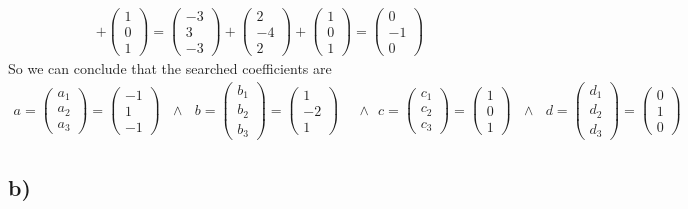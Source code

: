 \documentclass{article}
\begin{document}
\begin{align}
                + \left(\begin{matrix} 1\\0\\1 \end{matrix}\right)
                = \left(\begin{matrix} -3\\3\\-3 \end{matrix}\right) + \left(\begin{matrix} 2\\-4\\2 \end{matrix}\right)
                + \left(\begin{matrix} 1\\0\\1 \end{matrix}\right) = \left(\begin{matrix} 0\\-1\\0 \end{matrix}\right)
        \end{align}
        So we can conclude that the searched coefficients are
        \begin{align}
            a = \left(\begin{matrix} a_1\\a_2\\a_3 \end{matrix}\right) = \left(\begin{matrix} -1\\1\\-1 \end{matrix}\right)
            \ \ \ \wedge\ \ \ 
            b = \left(\begin{matrix} b_1\\b_2\\b_3 \end{matrix}\right) = \left(\begin{matrix} 1\\-2\\1 \end{matrix}\right)
            \ \ \ &\wedge\ \ \ 
            c = \left(\begin{matrix} c_1\\c_2\\c_3 \end{matrix}\right) = \left(\begin{matrix} 1\\0\\1 \end{matrix}\right)
            \ \ \ \wedge\ \ \ 
            d = \left(\begin{matrix} d_1\\d_2\\d_3 \end{matrix}\right) = \left(\begin{matrix} 0\\1\\0 \end{matrix}\right)
        \end{align}
        

\newpage
    \subsection*{b)}
    
    
    
    
    
\end{document}
